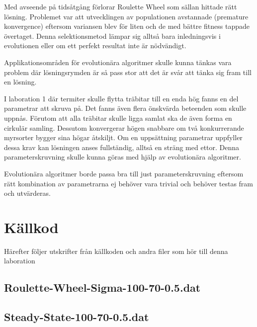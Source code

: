 \documentclass[titlepage, a4paper, 12pt]{article}
\begin{document}
Med avseende på tidsåtgång förlorar Roulette Wheel som sällan hittade
rätt lösning. Problemet var att utvecklingen av populationen
avstannade (premature konvergence) eftersom variansen blev för liten
och de med bättre fitness tappade övertaget. Denna selektionsmetod
lämpar sig alltså bara inledningsvis i evolutionen eller om ett
perfekt resultat inte är nödvändigt.

Applikationsområden för evolutionära algoritmer skulle kunna tänkas
vara problem där lösningsrymden är så pass stor att det är svår att
tänka sig fram till en lösning.

I laboration 1 där termiter skulle flytta träbitar till en enda hög
fanns en del parametrar att skruva på. Det fanns även flera önskvärda
beteenden som skulle uppnås. Förutom att alla träbitar skulle ligga
samlat ska de även forma en cirkulär samling. Dessutom konvergerar
högen snabbare om två konkurrerande myrsorter bygger sina högar
åtskiljt. Om en uppsättning parametrar uppfyller dessa krav kan
lösningen anses fullständig, alltså en sträng med ettor. Denna
parameterskruvning skulle kunna göras med hjälp av evolutionära
algoritmer.

Evolutionära algoritmer borde passa bra till just parameterskruvning
eftersom rätt kombination av parametrarna ej behöver vara trivial och
behöver testas fram och utvärderas.




\newpage
\appendix
{}
\section{Källkod}\label{sec:kallkod}
Härefter följer utskrifter från källkoden och andra filer som hör till
denna laboration

\subsection{Roulette-Wheel-Sigma-100-70-0.5.dat}\label{Roulette-Wheel-Sigma-100-70-0.5.dat}
\begin{footnotesize}
  
\end{footnotesize}

\subsection{Steady-State-100-70-0.5.dat}\label{Steady-State-100-70-0.5.dat}
\begin{footnotesize}
  
\end{footnotesize}
\end{document}
